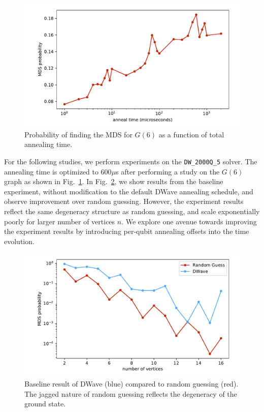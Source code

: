 \documentclass[prd,twocolumn,tightenlines,preprintnumbers,showpacs,superscriptaddress,notitlepage,nofootinbib,eqsecnum,floatfix,longbibliography]{revtex4}
\begin{document}
\begin{figure}[b]
    \centering
    \includegraphics[width=\columnwidth]{./figures/anneal_time_scaling.pdf}
    \caption{Probability of finding the MDS for $G(6)$ as a function of total annealing time.}
    \label{fig:at_scale}
\end{figure}

For the following studies, we perform experiments on the \texttt{DW\_2000Q\_5} solver.
The annealing time is optimized to 600$\mu$s after performing a study on the $G(6)$ graph as shown in Fig.~\ref{fig:at_scale}.
In Fig.~\ref{fig:baseline}, we show results from the baseline experiment, without modification to the default DWave annealing schedule, and observe improvement over random guessing.
However, the experiment results reflect the same degeneracy structure as random guessing, and scale exponentially poorly for larger number of vertices $n$.
We explore one avenue towards improving the experiment results by introducing per-qubit annealing offsets into the time evolution.

\begin{figure}
    \centering
    \includegraphics[width=\columnwidth]{./figures/scaling_baseline.pdf}
    \caption{Baseline result of DWave (blue) compared to random guessing (red).
The jagged nature of random guessing reflects the degeneracy of the ground state.}
    \label{fig:baseline}
\end{figure}
\end{document}
